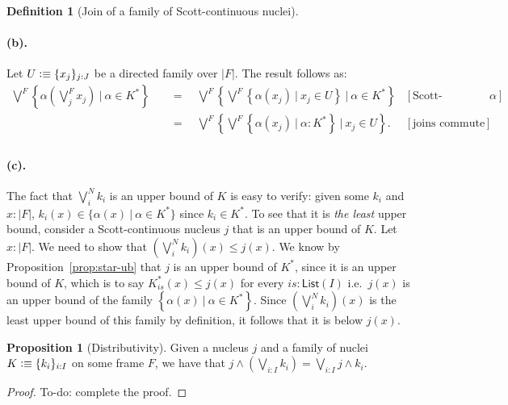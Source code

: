\documentclass[a4paper, 11pt]{article}
\theoremstyle{definition}
\newtheorem{prop}{Proposition}
\newtheorem{defn}{Definition}
\newcommand{\setof}[1]{\left\{ #1 \right\}}
\newcommand{\is}{\vcentcolon\equiv}
\newcommand{\todo}[1]{{\large\color{orange}\textsf{To-do: #1.}}}
\begin{document}
\begin{defn}[Join of a family of Scott-continuous nuclei]
  \paragraph{(b).} Let $U \is \{ x_j \}_{j : J}$ be a directed family over $| F |$. The result follows
  as:
  \begin{align*}
       \bigvee^F \setof{ \alpha\left(\bigvee^F_j x_j\right) ~|~ \alpha \in K^* }
  &\quad=\quad \bigvee^F \setof{ \bigvee^F \setof{ \alpha(x_j) ~|~ x_j \in U } ~|~ \alpha \in K^* }  & [\text{Scott-continuity of $\alpha$}] \\
  &\quad=\quad \bigvee^F \setof{ \bigvee^F \setof{ \alpha(x_j) ~|~ \alpha : K^* } ~|~ x_j \in U }. & [\text{joins commute}]          \\
  \end{align*}

  \paragraph{(c).} The fact that $\bigvee^N_i k_i$ is an upper bound of $K$ is easy to verify:
  given some $k_i$ and $x : | F |$, $k_i(x) \in \{ \alpha(x) ~|~ \alpha \in K^* \}$ since $k_i \in K^*$. To see that
  it is \emph{the least} upper bound, consider a Scott-continuous nucleus $j$ that is an upper bound
  of $K$. Let $x : | F |$. We need to show that $\left(\bigvee^N_i k_i\right)(x) \le j(x)$. We know by
  Proposition~\ref{prop:star-ub} that $j$ is an upper bound of $K^*$, since it is an upper bound of
  $K$, which is to say $K^*_{is}(x) \le j(x)$ for every $is : \mathsf{List}(I)$ i.e.\ $j(x)$ is an
  upper bound of the family $\setof{ \alpha(x) ~|~ \alpha \in K^* }$. Since $\left(\bigvee^N_i k_i\right)(x)$ is the
  least upper bound of this family by definition, it follows that it is below $j(x)$.
\end{defn}

\begin{prop}[Distributivity]
  Given a nucleus $j$ and a family of nuclei $K \is \{ k_i \}_{i : I}$ on some frame $F$, we have
  that $j \wedge \left(\bigvee_{i : I} k_i\right) = \bigvee_{i : I} j \wedge k_i$.
\end{prop}
\begin{proof}
  \todo{complete the proof}
\end{proof}

\printbibliography
\end{document}
